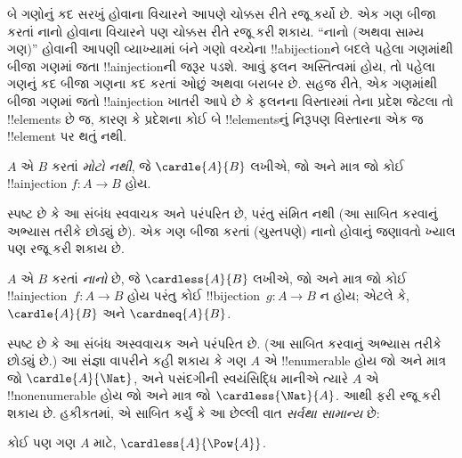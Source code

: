 \documentclass[../../../include/open-logic-section]{subfiles}
\begin{document}


\begin{explain}
બે ગણોનું કદ સરખું હોવાના વિચારને આપણે ચોક્કસ રીતે રજૂ કર્યો છે.
એક ગણ બીજા કરતાં નાનો હોવાના વિચારને પણ ચોક્કસ રીતે રજૂ કરી શકાય.
“નાનો (અથવા સામ્ય ગણ)” હોવાની આપણી વ્યાખ્યામાં બંને ગણો વચ્ચેના
!!a{bijection}ને બદલે પહેલા ગણમાંથી બીજા ગણમાં જતા !!a{injection}ની
જરૂર પડશે. આવું ફલન અસ્તિત્વમાં હોય, તો પહેલા ગણનું કદ બીજા
ગણના કદ કરતાં ઓછું અથવા બરાબર છે. સહજ રીતે, એક ગણમાંથી બીજા ગણમાં
જતો !!a{injection} ખાતરી આપે છે કે ફલનના વિસ્તારમાં તેના પ્રદેશ
જેટલા તો !!{element}s છે જ, કારણ કે પ્રદેશના કોઈ બે !!{element}sનું
નિરૂપણ વિસ્તારના એક જ !!{element} પર થતું નથી.
\end{explain}

\begin{defn}
$A$ એ $B$ કરતાં \emph{મોટો નથી}, જે $\cardle{A}{B}$ લખીએ,
જો અને માત્ર જો કોઈ !!a{injection} $f \colon A \to B$ હોય.
\end{defn}

સ્પષ્ટ છે કે આ સંબંધ સ્વવાચક અને પરંપરિત છે, પરંતુ સંમિત નથી
(આ સાબિત કરવાનું અભ્યાસ તરીકે છોડ્યું છે). એક ગણ બીજા કરતાં
(ચુસ્તપણે) નાનો હોવાનું જણાવતો ખ્યાલ પણ રજૂ કરી શકાય છે.

\begin{defn}
$A$ એ $B$ કરતાં \emph{નાનો} છે, જે $\cardless{A}{B}$ લખીએ,
જો અને માત્ર જો કોઈ !!a{injection}~$f\colon A \to B$ હોય પરંતુ
કોઈ !!{bijection}~$g\colon A \to B$ ન હોય; એટલે કે,
$\cardle{A}{B}$ અને $\cardneq{A}{B}$.
\end{defn}

સ્પષ્ટ છે કે આ સંબંધ અસ્વવાચક અને પરંપરિત છે. (આ સાબિત કરવાનું
અભ્યાસ તરીકે છોડ્યું છે.) આ સંજ્ઞા વાપરીને કહી શકાય કે ગણ $A$ એ
!!{enumerable} હોય જો અને માત્ર જો $\cardle{A}{\Nat}$, અને પસંદગીની સ્વયંસિદ્ધિ માનીએ ત્યારે $A$ એ
!!{nonenumerable} હોય જો અને માત્ર જો $\cardless{\Nat}{A}$.
આથી
 ફરી રજૂ
કરી શકાય છે. હકીકતમાં, \citet{Cantor1892}એ સાબિત કર્યું કે આ છેલ્લી
વાત \emph{સર્વથા સામાન્ય} છે:

\begin{thm}[કૅન્ટૉર]
કોઈ પણ ગણ $A$ માટે, $\cardless{A}{\Pow{A}}$.
\end{thm}
\end{document}
